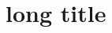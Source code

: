 \documentclass{beamer}
\begin{document}
    \begin{frame}
        \tableofcontents
    \end{frame}

    \section[short title]{long title}
    \frame{}
\end{document}
